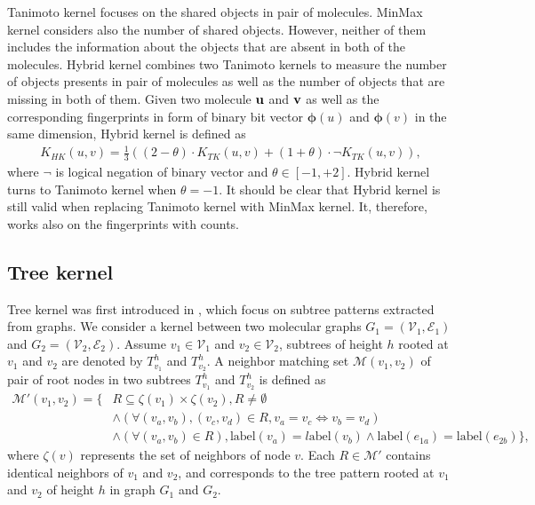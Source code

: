 \documentclass[english]{tktltiki}
\newcommand{\Ecal}{\mathcal{E}}
\newcommand{\Mcal}{\mathcal{M}}
\newcommand{\Vcal}{\mathcal{V}}
\newcommand{\vb}{{\bf v}}
\newcommand{\ub}{{\bf u}}
\newcommand{\vphi}{\mathbf{\phi}}
\begin{document}
Tanimoto kernel focuses on the shared objects in pair of molecules. MinMax kernel considers also the number of shared objects. However, neither of them includes the information about the objects that are absent in both of the molecules. Hybrid kernel \cite{ralaivola05} combines two Tanimoto kernels to measure the number of objects presents in pair of molecules as well as the number of objects that are missing in both of them. Given two molecule $\ub$ and $\vb$ as well as the corresponding fingerprints in form of binary bit vector $\vphi{(u)}$ and $\vphi{(v)}$ in the same dimension, Hybrid kernel is defined as
\begin{align*}
K_{HK}(u,v) = \frac{1}{3}((2-\theta)\cdot K_{TK}(u,v) + (1+\theta)\cdot \neg K_{TK}(u,v)),
\end{align*}
where $\neg$ is logical negation of binary vector and $\theta \in [-1,+2]$. Hybrid kernel turns to Tanimoto kernel when $\theta=-1$. It should be clear that Hybrid kernel is still valid when replacing Tanimoto kernel with MinMax kernel. It, therefore, works also on the fingerprints with counts.


\subsection{Tree kernel}

Tree kernel was first introduced in \cite{ramon03}, which focus on subtree patterns extracted from graphs. We consider a kernel between two molecular graphs $G_1 = (\Vcal_1,\Ecal_1)$ and $G_2 = (\Vcal_2,\Ecal_2)$. Assume $v_1 \in \Vcal_1$ and $v_2 \in \Vcal_2$, subtrees of height $h$ rooted at $v_1$ and $v_2$ are denoted by $T_{v_1}^h$ and $T_{v_2}^h$. 
A neighbor matching set $\Mcal(v_1,v_2)$ of pair of root nodes in two subtrees $T_{v_1}^h$ and $T_{v_2}^h$ is defined as
\begin{align*}
\Mcal'(v_1,v_2) = \{ &R \subseteq \zeta(v_1) \times \zeta(v_2), R \ne \emptyset \nonumber \\
 & \wedge (\forall(v_a,v_b),(v_c,v_d) \in R, v_a = v_c \Leftrightarrow v_b = v_d) \nonumber \\
 & \wedge (\forall(v_a,v_b)\in R),\text{label}(v_a)=l\text{abel}(v_b) \wedge \text{label}(e_{1a}) = \text{label}(e_{2b}) \},
\end{align*}
where $\zeta(v)$ represents the set of neighbors of node $v$. Each $R \in \Mcal'$ contains identical neighbors of $v_1$ and $v_2$, and corresponds to the tree pattern rooted at $v_1$ and $v_2$ of height $h$ in graph $G_1$ and $G_2$. 
\end{document}
